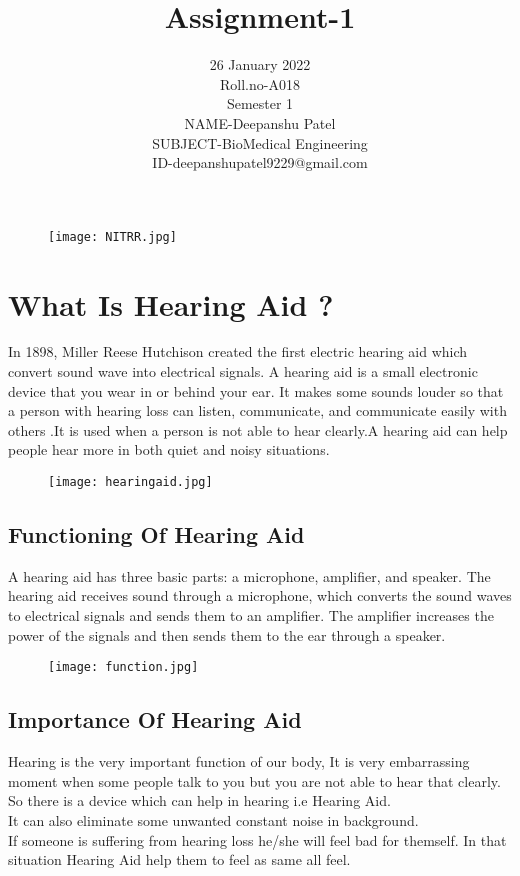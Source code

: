 \documentclass[12pt]{article}
\title{Assignment-1}
\date{26 January 2022\\Roll.no-A018\\Semester 1\\NAME-Deepanshu Patel\\SUBJECT-BioMedical Engineering\\ID-deepanshupatel9229@gmail.com\\}
\begin{document}
\begin{figure}
\centering
\texttt{[image: NITRR.jpg]}
\end{figure}


\maketitle




\clearpage
   
\section{What Is Hearing Aid ?}

In 1898, Miller Reese Hutchison created the first electric hearing aid which convert sound wave into electrical signals. A hearing aid is a small electronic device that you wear in or behind your ear. It makes some sounds louder so that a person with hearing loss can listen, communicate, and communicate easily with others .It is used when a person is not able to hear clearly.A hearing aid can help people hear more in both quiet and noisy situations.
 

\begin{figure}[h]
\centering
\texttt{[image: hearingaid.jpg]}
\end{figure} 




\subsection{Functioning Of Hearing Aid}

A hearing aid has three basic parts: a microphone, amplifier, and speaker. The hearing aid receives sound through a microphone, which converts the sound waves to electrical signals and sends them to an amplifier. The amplifier increases the power of the signals and then sends them to the ear through a speaker.

\begin{figure}[h]
\texttt{[image: function.jpg]}
\end{figure}

\subsection{Importance Of Hearing Aid }


Hearing is the very important function of our body, It is very embarrassing moment when some people talk to you but you are not able to hear that clearly. So there is a device which can help in hearing i.e Hearing Aid.\\
It can also eliminate some unwanted constant noise in background.\\
If someone is suffering from hearing loss he/she will feel bad for themself. In that situation Hearing Aid help them to feel as same all feel.
\end{document}
